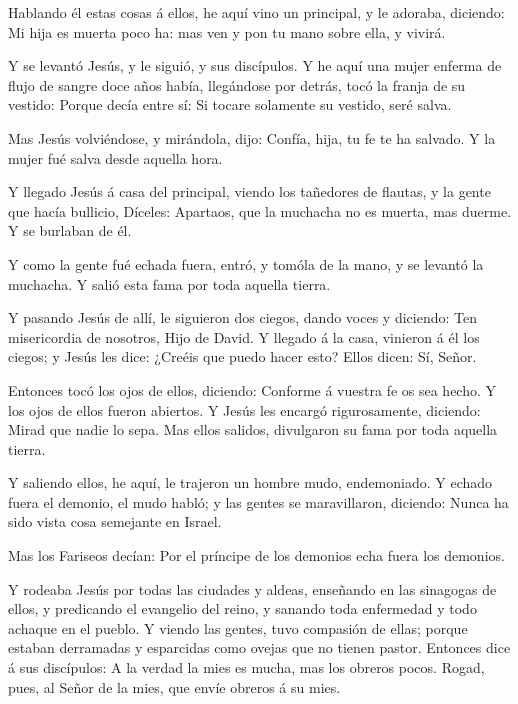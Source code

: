  Hablando él estas cosas á ellos, he aquí vino un
principal, y le adoraba, diciendo: Mi hija es muerta poco ha: mas ven y
pon tu mano sobre ella, y vivirá.

 Y se levantó Jesús, y le siguió, y sus discípulos.
 Y he aquí una mujer enferma de flujo de sangre doce años
había, llegándose por detrás, tocó la franja de su vestido:
 Porque decía entre sí: Si tocare solamente su vestido,
seré salva.

 Mas Jesús volviéndose, y mirándola, dijo: Confía, hija, tu
fe te ha salvado. Y la mujer fué salva desde aquella hora.

 Y llegado Jesús á casa del principal, viendo los tañedores
de flautas, y la gente que hacía bullicio,  Díceles:
Apartaos, que la muchacha no es muerta, mas duerme. Y se burlaban de él.

 Y como la gente fué echada fuera, entró, y tomóla de la
mano, y se levantó la muchacha.  Y salió esta fama por toda
aquella tierra.

 Y pasando Jesús de allí, le siguieron dos ciegos, dando
voces y diciendo: Ten misericordia de nosotros, Hijo de David.
 Y llegado á la casa, vinieron á él los ciegos; y Jesús les
dice: ¿Creéis que puedo hacer esto? Ellos dicen: Sí, Señor.

 Entonces tocó los ojos de ellos, diciendo: Conforme á
vuestra fe os sea hecho.  Y los ojos de ellos fueron
abiertos. Y Jesús les encargó rigurosamente, diciendo: Mirad que nadie
lo sepa.  Mas ellos salidos, divulgaron su fama por toda
aquella tierra.

 Y saliendo ellos, he aquí, le trajeron un hombre mudo,
endemoniado.  Y echado fuera el demonio, el mudo habló; y
las gentes se maravillaron, diciendo: Nunca ha sido vista cosa semejante
en Israel.

 Mas los Fariseos decían: Por el príncipe de los demonios
echa fuera los demonios.

 Y rodeaba Jesús por todas las ciudades y aldeas, enseñando
en las sinagogas de ellos, y predicando el evangelio del reino, y
sanando toda enfermedad y todo achaque en el pueblo.  Y
viendo las gentes, tuvo compasión de ellas; porque estaban derramadas y
esparcidas como ovejas que no tienen pastor.  Entonces dice
á sus discípulos: A la verdad la mies es mucha, mas los obreros pocos.
 Rogad, pues, al Señor de la mies, que envíe obreros á su
mies.

